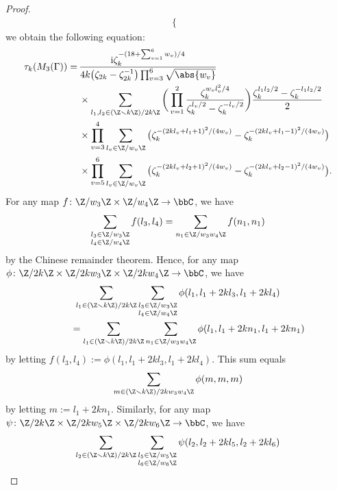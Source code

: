 \begin{proof}
\begin{gather*}
\begin{cases}
	\end{cases}
	\end{gather*}
	we obtain the following equation:
\begin{align*}
		\tau_{k}(M_3(\Gamma))
		= \,
		&\frac{{\rm i} \zeta_{k}^{-(18 + \sum_{v=1}^{6}w_{v})/4}}{4k \big(\zeta_{2k}-\zeta_{2k}^{-1}\big) \prod_{v=3}^{6} \sqrt{\abs{w_{v}}}}
\\
		&\times \sum_{l_{1}, l_{2} \in (\Z \smallsetminus k\Z) / 2k\Z}
		\bigg( \prod_{v=1}^{2} \frac{\zeta_{k}^{w_{v}l_{v}^{2}/4}}{\zeta_{k}^{l_{v}/2} - \zeta_{k}^{-l_{v}/2}} \bigg) \frac{\zeta_{k}^{l_{1}l_{2}/2} - \zeta_{k}^{-l_{1}l_{2}/2}}{2}
\\
		&\times \prod_{v=3}^{4} \sum_{l_{v} \in \Z / w_{v}\Z} \big( \zeta_{k}^{-(2kl_{v} + l_{1} + 1)^{2}/(4w_{v})} - \zeta_{k}^{-(2kl_{v} + l_{1} - 1)^{2}/(4w_{v})} \big)
\\
		&\times \prod_{v=5}^{6} \sum_{l_{v} \in \Z / w_{v}\Z} \big( \zeta_{k}^{-(2kl_{v} + l_{2} + 1)^{2}/(4w_{v})} - \zeta_{k}^{-(2kl_{v} + l_{2} - 1)^{2}/(4w_{v})} \big).
	\end{align*}
	For any map $ f \colon \Z / w_{3}\Z \times \Z / w_{4}\Z \to \bbC $, we have
	\begin{gather*}
	\sum_{\substack{l_{3} \in \Z / w_{3}\Z \\ l_{4} \in \Z / w_{4}\Z}} f(l_3, l_4)
	=	\sum_{n_{1} \in \Z / w_{3}w_{4}\Z} f(n_1, n_1)
	\end{gather*}
	by the Chinese remainder theorem.
	Hence, for any map $ \phi \colon \Z/2k\Z \times \Z / 2k w_{3}\Z \times \Z / 2k w_{4}\Z \to \bbC $, we have
	\begin{gather*}
		\sum_{l_1 \in (\Z \smallsetminus k\Z) / 2k \Z} \sum_{\substack{l_{3} \in \Z / w_{3}\Z \\ l_{4} \in \Z / w_{4}\Z}} \phi (l_1, l_1 + 2k l_3, l_1 + 2k l_4)
\\ \qquad
		{}= \sum_{l_1 \in (\Z \smallsetminus k\Z) / 2k \Z} \sum_{n_{1} \in \Z / w_{3}w_{4}\Z} \phi (l_1, l_1 + 2k n_1, l_1 + 2k n_1)
	\end{gather*}
	by letting $ f(l_3, l_4) := \phi (l_1, l_1 + 2k l_3, l_1 + 2k l_4) $.
	This sum equals
	\begin{gather*}
	\sum_{m \in (\Z \smallsetminus k\Z) / 2k w_3 w_4\Z} \phi (m, m, m)
	\end{gather*}
	by letting $ m := l_1 + 2k n_1 $.
	Similarly, for any map $ \psi \colon \Z/2k\Z \times \Z / 2k w_{5}\Z \times \Z / 2k w_{6}\Z \to \bbC $, we have
	\begin{align*}
		\sum_{l_2 \in (\Z \smallsetminus k\Z) / 2k \Z} \sum_{\substack{l_{5} \in \Z / w_{5}\Z \\ l_{6} \in \Z / w_{6}\Z}} \psi (l_2, l_2 + 2k l_5, l_2 + 2k l_6)

\end{align*}
\end{proof}
